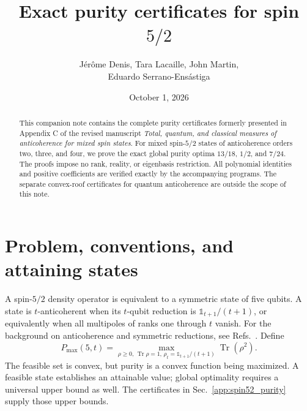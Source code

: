 \documentclass[11pt]{article}
\title{Exact purity certificates for spin $5/2$}
\author{J\'er\^ome Denis, Tara Lacaille, John Martin,\\Eduardo Serrano-Ens\'astiga}
\date{October 1, 2026}
\DeclareMathOperator{\Tr}{Tr}
\begin{document}
\maketitle
\begin{abstract}
This companion note contains the complete purity certificates formerly presented in Appendix C of the revised manuscript \emph{Total, quantum, and classical measures of anticoherence for mixed spin states}. For mixed spin-$5/2$ states of anticoherence orders two, three, and four, we prove the exact global purity optima $13/18$, $1/2$, and $7/24$. The proofs impose no rank, reality, or eigenbasis restriction. All polynomial identities and positive coefficients are verified exactly by the accompanying programs. The separate convex-roof certificates for quantum anticoherence are outside the scope of this note.
\end{abstract}

\section{Problem, conventions, and attaining states}
A spin-$5/2$ density operator is equivalent to a symmetric state of five qubits. A state is $t$-anticoherent when its $t$-qubit reduction is $\mathbb 1_{t+1}/(t+1)$, or equivalently when all multipoles of ranks one through $t$ vanish. For the background on anticoherence and symmetric reductions, see Refs.~\cite{Denis2026,BaguetteMartin2017}. Define
\begin{equation}
 P_{\max}(5,t)=\max_{\rho\ge0,\,\Tr\rho=1,\,\rho_t=\mathbb 1_{t+1}/(t+1)}\Tr(\rho^2).
\end{equation}
The feasible set is convex, but purity is a convex function being maximized. A feasible state establishes an attainable value; global optimality requires a universal upper bound as well. The certificates in Sec.~\ref{app:spin52_purity} supply those upper bounds.
\end{document}
